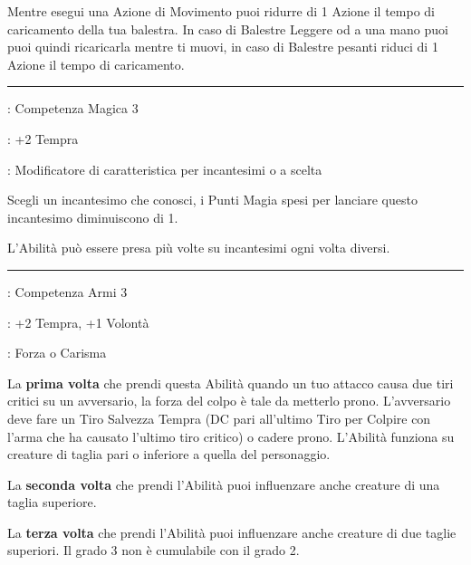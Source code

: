 \begin{multicols}{2}
Mentre esegui una Azione di Movimento puoi ridurre di 1 Azione il tempo di caricamento della tua balestra. In caso di Balestre Leggere od a una mano puoi puoi quindi ricaricarla mentre ti muovi, in caso di Balestre pesanti riduci di 1 Azione il tempo di caricamento.

\smallskip\noindent\rule{\linewidth}{2pt} \hypertarget{Specialista}{}\medskip{}
\noindent
\begin{description}[noitemsep, topsep=0pt, parsep=0pt, partopsep=0pt, leftmargin=0cm, labelwidth=2.5cm]
    \item[\textbf{Requisito}]: Competenza Magica 3
    \item[\textbf{Tiri Salvezza}]: +2 Tempra
    \item[\textbf{Caratteristica}]: Modificatore di caratteristica per incantesimi o a scelta
\end{description}

Scegli un incantesimo che conosci, i Punti Magia spesi per lanciare questo incantesimo diminuiscono di 1.

L'Abilità può essere presa più volte su incantesimi ogni volta diversi.

\smallskip\noindent\rule{\linewidth}{2pt} \hypertarget{Stai giù!}{}\medskip{}
\noindent
\begin{description}[noitemsep, topsep=0pt, parsep=0pt, partopsep=0pt, leftmargin=0cm, labelwidth=2.5cm]
    \item[\textbf{Requisito}]: Competenza Armi 3
    \item[\textbf{Tiri Salvezza}]: +2 Tempra, +1 Volontà
    \item[\textbf{Caratteristica}]: Forza o Carisma
\end{description}

La \textbf{prima volta} che prendi questa Abilità quando un tuo attacco causa due tiri critici su un avversario, la forza del colpo è tale da metterlo prono. L'avversario deve fare un Tiro Salvezza Tempra (DC pari all'ultimo Tiro per Colpire con l'arma che ha causato l'ultimo tiro critico) o cadere prono. L'Abilità funziona su creature di taglia pari o inferiore a quella del personaggio.

La \textbf{seconda volta} che prendi l'Abilità puoi influenzare anche creature di una taglia superiore.

La \textbf{terza volta} che prendi l'Abilità puoi influenzare anche creature di due taglie superiori. Il grado 3 non è cumulabile con il grado 2.


\end{multicols}
